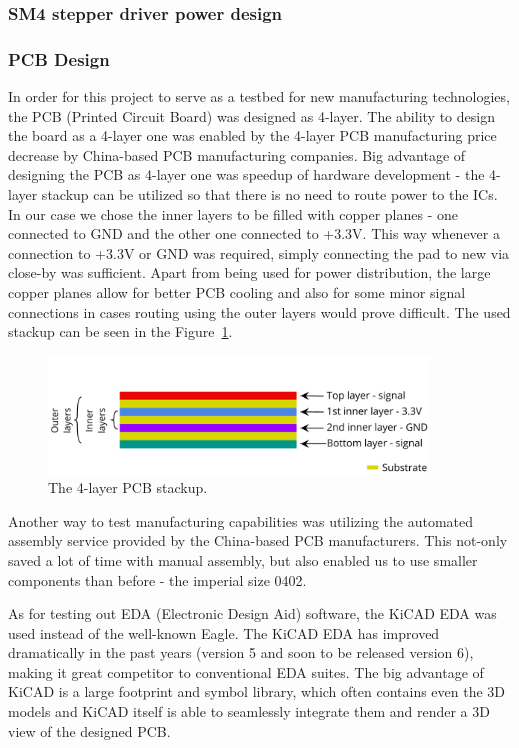 
\subsubsection{SM4 stepper driver power design}
\label{subsubsec:power_design}

\subsubsection{PCB Design}
\label{subsubsec:pcb_design}
In order for this project to serve as a testbed for new manufacturing technologies, the PCB (Printed Circuit Board) was designed as 4-layer.
The ability to design the board as a 4-layer one was enabled by the 4-layer PCB manufacturing price decrease by China-based PCB manufacturing companies.
Big advantage of designing the PCB as 4-layer one was speedup of hardware development - the 4-layer stackup can be utilized so that there is no need to route power to the ICs.
In our case we chose the inner layers to be filled with copper planes - one connected to GND and the other one connected to +3.3V.
This way whenever a connection to +3.3V or GND was required, simply connecting the pad to new via close-by was sufficient.
Apart from being used for power distribution, the large copper planes allow for better PCB cooling and also for some minor signal connections in cases routing using the outer layers would prove difficult.
The used stackup can be seen in the Figure~\ref{fig:stackup}.

\begin{figure}[H]
    \centering
    \includegraphics[width=0.9\textwidth]{obrazky/stackup}
    \caption{The 4-layer PCB stackup.}
    \label{fig:stackup}
\end{figure}

Another way to test manufacturing capabilities was utilizing the automated assembly service provided by the China-based PCB manufacturers.
This not-only saved a lot of time with manual assembly, but also enabled us to use smaller components than before - the imperial size 0402.

As for testing out EDA (Electronic Design Aid) software, the KiCAD EDA was used instead of the well-known Eagle.
The KiCAD EDA has improved dramatically in the past years (version 5 and soon to be released version 6), making it great competitor to conventional EDA suites.
The big advantage of KiCAD is a large footprint and symbol library, which often contains even the 3D models and KiCAD itself is able to seamlessly integrate them and render a 3D view of the designed PCB.


